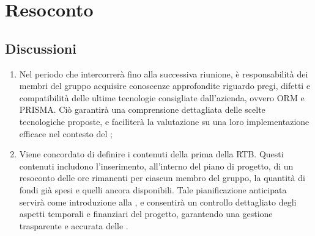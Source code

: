 \section{Resoconto} \label{sec:resoconto}
\subsection{Discussioni} \label{subsec:resdiscussione}
\begin{enumerate}
    \item Nel periodo che intercorrerà fino alla successiva riunione, è responsabilità dei membri del gruppo acquisire conoscenze approfondite riguardo  pregi, difetti e compatibilità delle ultime tecnologie consigliate dall'azienda, ovvero ORM e PRISMA. Ciò garantirà una comprensione dettagliata delle scelte tecnologiche proposte, e faciliterà la valutazione su una loro implementazione efficace nel contesto del ; 
    
    \item Viene concordato di definire i contenuti della  prima della RTB. Questi contenuti includono l'inserimento, all'interno del piano di progetto, di un resoconto delle ore rimanenti per ciascun membro del gruppo, la quantità di fondi già spesi e quelli ancora disponibili. Tale pianificazione anticipata servirà come introduzione alla , e consentirà un controllo dettagliato degli aspetti temporali e finanziari del progetto, garantendo una gestione trasparente e accurata delle .
    
\end{enumerate}

